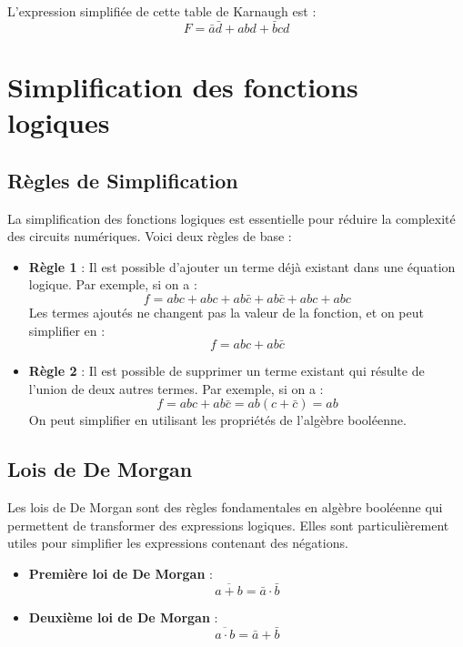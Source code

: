 \documentclass[10pt,a4paper]{article}
\begin{document}
L'expression simplifiée de cette table de Karnaugh est :
\[ F = \bar{a}\bar{d} + abd + \bar{b}cd \]

\section*{Simplification des fonctions logiques}

\subsection*{Règles de Simplification}

La simplification des fonctions logiques est essentielle pour réduire la complexité des circuits numériques. Voici deux règles de base :

\begin{itemize}
    \item \textbf{Règle 1} : Il est possible d'ajouter un terme déjà existant dans une équation logique. Par exemple, si on a :
    \[ f = abc + abc + ab\bar{c} + ab\bar{c} + abc + abc \]
    Les termes ajoutés ne changent pas la valeur de la fonction, et on peut simplifier en :
    \[ f = abc + ab\bar{c} \]


    \item \textbf{Règle 2} : Il est possible de supprimer un terme existant qui résulte de l'union de deux autres termes. Par exemple, si on a :
    \[ f = abc + ab\bar{c} = ab(c+\bar{c}) = ab \]
    On peut simplifier en utilisant les propriétés de l'algèbre booléenne.

\end{itemize}

\subsection*{Lois de De Morgan}

Les lois de De Morgan sont des règles fondamentales en algèbre booléenne qui permettent de transformer des expressions logiques. Elles sont particulièrement utiles pour simplifier les expressions contenant des négations.

\begin{itemize}
    \item \textbf{Première loi de De Morgan} :
    \[ \overline{a + b} = \bar{a} \cdot \bar{b} \]

    \item \textbf{Deuxième loi de De Morgan} :
    \[ \overline{a \cdot b} = \bar{a} + \bar{b} \]

\end{itemize}
\end{document}

